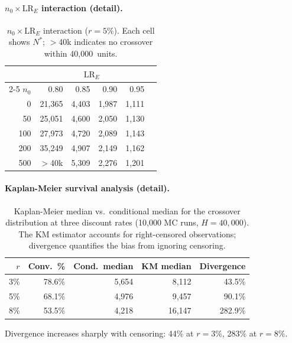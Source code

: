\documentclass[preprint,12pt]{elsarticle}
\begin{document}
\paragraph{$n_0 \times \mathrm{LR}_E$ interaction (detail).}

\begin{table}[htbp]
\centering
\caption{$n_0 \times \mathrm{LR}_E$ interaction ($r = 5\%$). Each cell shows $N^*$; $>$40k indicates no crossover within 40{,}000~units.}
\label{tab:n0_lr_interaction}
\small
\begin{tabular}{@{}rrrrrr@{}}
\toprule
 & \multicolumn{4}{c}{$\mathrm{LR}_E$} \\
\cmidrule(l){2-5}
$n_0$ & 0.80 & 0.85 & 0.90 & 0.95 \\
\midrule
0   & 21{,}365 & 4{,}403 & 1{,}987 & 1{,}111 \\
50  & 25{,}051 & 4{,}600 & 2{,}050 & 1{,}130 \\
100 & 27{,}973 & 4{,}720 & 2{,}089 & 1{,}143 \\
200 & 35{,}249 & 4{,}907 & 2{,}149 & 1{,}162 \\
500 & $>$40k   & 5{,}309 & 2{,}276 & 1{,}201 \\
\bottomrule
\end{tabular}
\end{table}

\paragraph{Kaplan-Meier survival analysis (detail).}

\begin{table}[htbp]
\centering
\caption{Kaplan-Meier median vs.\ conditional median for the crossover distribution at three discount rates (10{,}000 MC runs, $H = 40{,}000$). The KM estimator accounts for right-censored observations; divergence quantifies the bias from ignoring censoring.}
\label{tab:kaplan_meier}
\small
\begin{tabular}{@{}rrrrr@{}}
\toprule
$r$ & Conv.\ \% & Cond.\ median & KM median & Divergence \\
\midrule
3\%  & 78.6\% & 5{,}654 & 8{,}112  & 43.5\% \\
5\%  & 68.1\% & 4{,}976 & 9{,}457  & 90.1\% \\
8\%  & 53.5\% & 4{,}218 & 16{,}147 & 282.9\% \\
\bottomrule
\end{tabular}
\end{table}

Divergence increases sharply with censoring: 44\% at $r = 3\%$, 283\% at $r = 8\%$.
\end{document}
